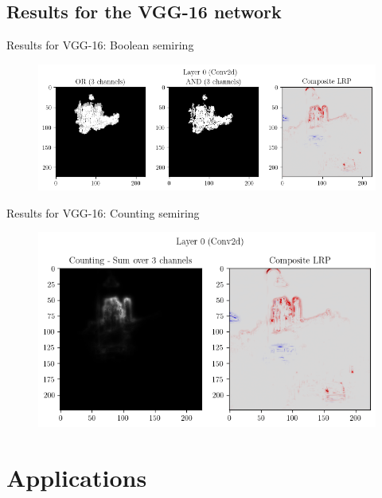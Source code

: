 \documentclass[aspectratio=169]{beamer}
\theoremstyle{definition}
\begin{document}
\subsection{Results for the VGG-16 network}
\begin{frame}{Results for VGG-16: Boolean semiring}
    \begin{figure}[H]
        \centering
        \includegraphics[width=\textwidth]{vgg-boolean.png}
    \end{figure}
\end{frame}

\begin{frame}{Results for VGG-16: Counting semiring}
    \begin{figure}[H]
        \centering
        \includegraphics[width=.8\textwidth]{vgg-counting.png}
    \end{figure}
\end{frame}


\section{Applications}
\end{document}
